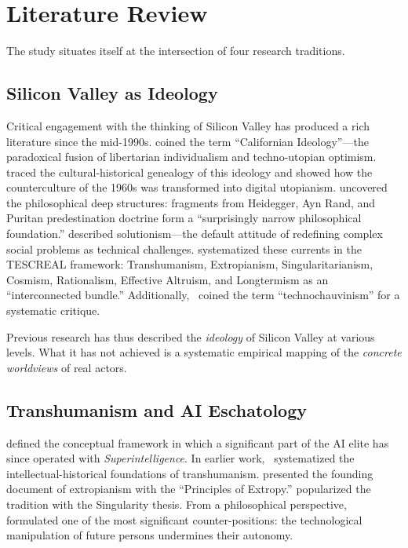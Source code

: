 \documentclass[12pt,a4paper]{article}
\begin{document}
\section{Literature Review}
\label{sec:forschungsstand}

The study situates itself at the intersection of four research traditions.

\subsection{Silicon Valley as Ideology}
\label{sec:forschungsstand:sv}

Critical engagement with the thinking of Silicon Valley has produced a rich literature since the mid-1990s. \citet{BarbCam1996} coined the term ``Californian Ideology''---the paradoxical fusion of libertarian individualism and techno-utopian optimism. \citet{Turner2006} traced the cultural-historical genealogy of this ideology and showed how the counterculture of the 1960s was transformed into digital utopianism. \citet{Daub2020} uncovered the philosophical deep structures: fragments from Heidegger, Ayn Rand, and Puritan predestination doctrine form a ``surprisingly narrow philosophical foundation.'' \citet{Morozov2013} described solutionism---the default attitude of redefining complex social problems as technical challenges. \citet{TorresGebru2024} systematized these currents in the TESCREAL framework: Transhumanism, Extropianism, Singularitarianism, Cosmism, Rationalism, Effective Altruism, and Longtermism as an ``interconnected bundle.'' Additionally,~\citet{Broussard2018} coined the term ``technochauvinism'' for a systematic critique.

Previous research has thus described the \emph{ideology} of Silicon Valley at various levels. What it has not achieved is a systematic empirical mapping of the \emph{concrete worldviews} of real actors.


\subsection{Transhumanism and AI Eschatology}
\label{sec:forschungsstand:transhumanismus}

\citet{Bostrom2014} defined the conceptual framework in which a significant part of the AI elite has since operated with \emph{Superintelligence}. In earlier work,~\citet{Bostrom2005} systematized the intellectual-historical foundations of transhumanism. \citet{More2003} presented the founding document of extropianism with the ``Principles of Extropy.'' \citet{Kurzweil2005} popularized the tradition with the Singularity thesis. From a philosophical perspective,~\citet{Habermas2001} formulated one of the most significant counter-positions: the technological manipulation of future persons undermines their autonomy.
\end{document}
